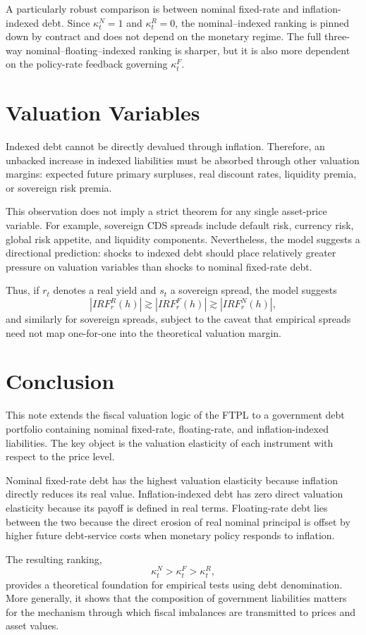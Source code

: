 \documentclass[12pt,a4paper]{article}
\begin{document}
A particularly robust comparison is between nominal fixed-rate and inflation-indexed
debt. Since $\kappa_t^N=1$ and $\kappa_t^R=0$, the nominal--indexed ranking is pinned
down by contract and does not depend on the monetary regime. The full three-way
nominal--floating--indexed ranking is sharper, but it is also more dependent on the
policy-rate feedback governing $\kappa_t^F$.

\section{Valuation Variables}

Indexed debt cannot be directly devalued through inflation. Therefore, an unbacked
increase in indexed liabilities must be absorbed through other valuation margins:
expected future primary surpluses, real discount rates, liquidity premia, or sovereign
risk premia.

This observation does not imply a strict theorem for any single asset-price variable.
For example, sovereign CDS spreads include default risk, currency risk, global risk
appetite, and liquidity components. Nevertheless, the model suggests a directional
prediction: shocks to indexed debt should place relatively greater pressure on valuation
variables than shocks to nominal fixed-rate debt.

Thus, if $r_t$ denotes a real yield and $s_t$ a sovereign spread, the model suggests
\begin{equation}
|IRF_r^R(h)|
\gtrsim
|IRF_r^F(h)|
\gtrsim
|IRF_r^N(h)|,
\end{equation}
and similarly for sovereign spreads, subject to the caveat that empirical spreads need
not map one-for-one into the theoretical valuation margin.

\section{Conclusion}

This note extends the fiscal valuation logic of the FTPL to a government debt portfolio
containing nominal fixed-rate, floating-rate, and inflation-indexed liabilities. The key
object is the valuation elasticity of each instrument with respect to the price level.

Nominal fixed-rate debt has the highest valuation elasticity because inflation directly
reduces its real value. Inflation-indexed debt has zero direct valuation elasticity because
its payoff is defined in real terms. Floating-rate debt lies between the two because the
direct erosion of real nominal principal is offset by higher future debt-service costs when
monetary policy responds to inflation.

The resulting ranking,
\begin{equation}
\kappa_t^N>\kappa_t^F>\kappa_t^R,
\end{equation}
provides a theoretical foundation for empirical tests using debt denomination. More
generally, it shows that the composition of government liabilities matters for the
mechanism through which fiscal imbalances are transmitted to prices and asset values.



\end{document}
